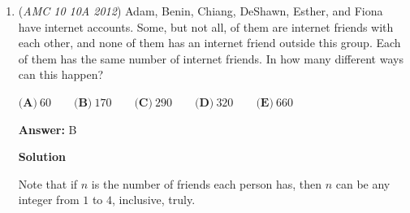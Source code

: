 \begin{enumerate}
 $(n+a)^2 = n(n+1) + 212$.Expanding, grouping like terms and factoring, we get:$n = \frac{(212 - a^2)}{(2a - 1)}$.

 We know that $n$ and $a$ are both positive integers, so we need only check values of $a$ from $1$ to $14$ ($14^2 = 196 < 212 < 15^2 = 225$). Plugging in, the only values of $a$ that give integral solutions are $1, 4,$ and $6$. These gives $n$ values of $211, 28,$ and $16$, respectively. $211 + 28 + 16 = 255$. Hence, the answer is $\boxed{\textbf{(A)}\ 255}$.

 



\textbf{Solution 3}

Using the closed forms for the sums, we get $m^2=n(n+1)+212$, or $m^2=n^2+n+212$. We would like to factor this equation, but the current expressions don't allow for this. So we multiply both sides by 4 to let us complete the square. Our equation is now $4m^2=4n^2+4n+848$. Complete the square on the right hand side: $4m^2=(4n^2+4n+1)+848-1=(2n+1)^2+847$. Move over the $(2n+1)^2$ and factor to get $(2m-2n-1)(2m+2n+1)=847=7\cdot11\cdot11$. The second factor is clearly greater than the first, and the only possible factor pairs are $1$ and $847$, $7$ and $121$, $11$ and $77$. In each of these cases, solve for $m$ and $n$ and we find the solutions $(m,n)=(212,211), (32,28), (22,16)$. The sum of all possible values of $n$ is $211+28+16=\boxed{\textbf{(A)}\ 255}$.

 \href{https://artofproblemsolving.com/videos/amc/2012amc10a/252}{https://artofproblemsolving.com/videos/amc/2012amc10a/252}

 


	\item (\textit{AMC 10 10A 2012}) Adam, Benin, Chiang, DeShawn, Esther, and Fiona have internet accounts.  Some, but not all, of them are internet friends with each other, and none of them has an internet friend outside this group.  Each of them has the same number of internet friends.  In how many different ways can this happen?


 $\textbf{(A)}\ 60\qquad\textbf{(B)}\ 170\qquad\textbf{(C)}\ 290\qquad\textbf{(D)}\ 320\qquad\textbf{(E)}\ 660$

 \textbf{Answer: }B



\textbf{Solution}

Note that if $n$ is the number of friends each person has, then $n$ can be any integer from $1$ to $4$, inclusive, truly.


\end{enumerate}
